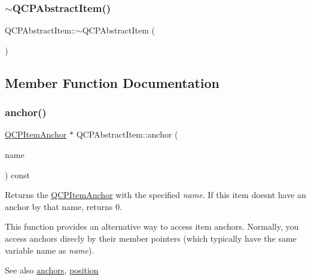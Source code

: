 \subsubsection{\texorpdfstring{$\sim$\+Q\+C\+P\+Abstract\+Item()}{~QCPAbstractItem()}}
{\footnotesize\ttfamily Q\+C\+P\+Abstract\+Item\+::$\sim$\+Q\+C\+P\+Abstract\+Item (\begin{DoxyParamCaption}{ }\end{DoxyParamCaption})\hspace{0.3cm}{\ttfamily [virtual]}}



\subsection{Member Function Documentation}
\mbox{\label{class_q_c_p_abstract_item_a139c255ea8831642fac91748e29a5adb}} 
\subsubsection{\texorpdfstring{anchor()}{anchor()}}
{\footnotesize\ttfamily \hyperlink{class_q_c_p_item_anchor}{Q\+C\+P\+Item\+Anchor} $\ast$ Q\+C\+P\+Abstract\+Item\+::anchor (\begin{DoxyParamCaption}\item[{const Q\+String \&}]{name }\end{DoxyParamCaption}) const}

Returns the \hyperlink{class_q_c_p_item_anchor}{Q\+C\+P\+Item\+Anchor} with the specified {\itshape name}. If this item doesn\textquotesingle{}t have an anchor by that name, returns 0.

This function provides an alternative way to access item anchors. Normally, you access anchors direcly by their member pointers (which typically have the same variable name as {\itshape name}).

\begin{DoxySeeAlso}{See also}
\hyperlink{class_q_c_p_abstract_item_a81d1ecfea3368b836cf9675a0045e659}{anchors}, \hyperlink{class_q_c_p_abstract_item_a2589c3d298f9a576d77d9addb440a18d}{position} 
\end{DoxySeeAlso}
\mbox{\label{class_q_c_p_abstract_item_ada5bad4e1196c4fc0d0d12328e24b8f2}} 
